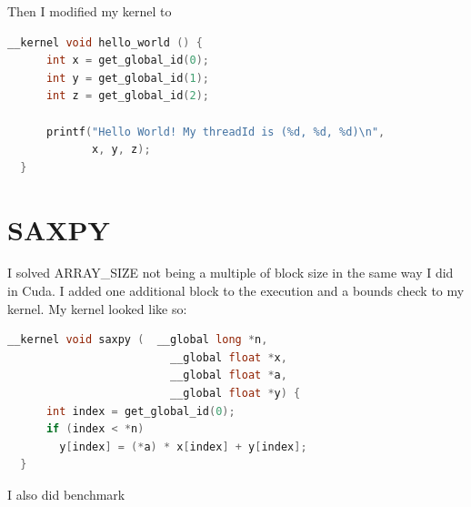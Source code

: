 \documentclass{article}
\begin{document}
Then I modified my kernel to

\begin{mdframed}[backgroundcolor=codeColor,leftmargin=0.0cm,hidealllines=true,%
  innerleftmargin=0.1cm,innerrightmargin=0.1cm,innertopmargin=0.5cm,innerbottommargin=0.10cm,
  roundcorner=15pt]
\begin{lstlisting}[language=C]
  __kernel void hello_world () {                                                                     
      int x = get_global_id(0);                                         
      int y = get_global_id(1);                                         
      int z = get_global_id(2);                                         
                                                                        
      printf("Hello World! My threadId is (%d, %d, %d)\n", 
             x, y, z); 
  }                                                                     
\end{lstlisting}
\end{mdframed}

\newpage 
\section{SAXPY}%
\label{sec:hello_world}

I solved ARRAY\_SIZE not being a multiple of block size in the same way I did in Cuda. I added one additional block to the execution and a bounds check to my kernel. My kernel looked like so:

\begin{mdframed}[backgroundcolor=codeColor,leftmargin=0.0cm,hidealllines=true,%
  innerleftmargin=0.1cm,innerrightmargin=0.1cm,innertopmargin=0.5cm,innerbottommargin=0.10cm,
  roundcorner=15pt]
\begin{lstlisting}[language=C]
  __kernel void saxpy (  __global long *n,            
                         __global float *x,           
                         __global float *a,           
                         __global float *y) {                                            
      int index = get_global_id(0);            
      if (index < *n)                          
        y[index] = (*a) * x[index] + y[index]; 
  }                                            
\end{lstlisting}
\end{mdframed}

I also did benchmark
\end{document}
